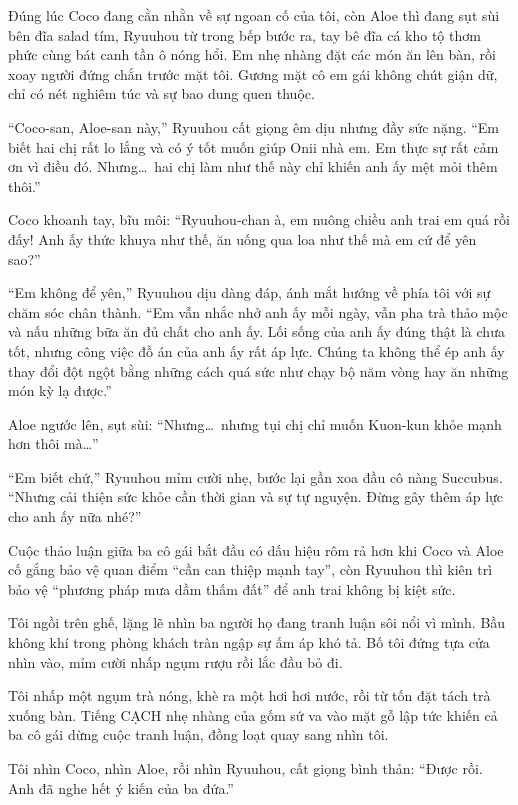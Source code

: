 \documentclass[../main.tex]{subfiles}
\begin{document}
\ct

Đúng lúc Coco đang cằn nhằn về sự ngoan cố của tôi, còn Aloe thì đang sụt sùi bên đĩa salad tím, Ryuuhou từ trong bếp bước ra, tay bê đĩa cá kho tộ thơm phức cùng bát canh tần ô nóng hổi. Em nhẹ nhàng đặt các món ăn lên bàn, rồi xoay người đứng chắn trước mặt tôi. Gương mặt cô em gái không chút giận dữ, chỉ có nét nghiêm túc và sự bao dung quen thuộc.

``Coco-san, Aloe-san này,'' Ryuuhou cất giọng êm dịu nhưng đầy sức nặng. ``Em biết hai chị rất lo lắng và có ý tốt muốn giúp Onii nhà em. Em thực sự rất cảm ơn vì điều đó. Nhưng\dots\ hai chị làm như thế này chỉ khiến anh ấy mệt mỏi thêm thôi.''

Coco khoanh tay, bĩu môi: ``Ryuuhou-chan à, em nuông chiều anh trai em quá rồi đấy! Anh ấy thức khuya như thế, ăn uống qua loa như thế mà em cứ để yên sao?''

``Em không để yên,'' Ryuuhou dịu dàng đáp, ánh mắt hướng về phía tôi với sự chăm sóc chân thành. ``Em vẫn nhắc nhở anh ấy mỗi ngày, vẫn pha trà thảo mộc và nấu những bữa ăn đủ chất cho anh ấy. Lối sống của anh ấy đúng thật là chưa tốt, nhưng công việc đồ án của anh ấy rất áp lực. Chúng ta không thể ép anh ấy thay đổi đột ngột bằng những cách quá sức như chạy bộ năm vòng hay ăn những món kỳ lạ được.''

Aloe ngước lên, sụt sùi: ``Nhưng\dots\ nhưng tụi chị chỉ muốn Kuon-kun khỏe mạnh hơn thôi mà\dots''

``Em biết chứ,'' Ryuuhou mỉm cười nhẹ, bước lại gần xoa đầu cô nàng Succubus. ``Nhưng cải thiện sức khỏe cần thời gian và sự tự nguyện. Đừng gây thêm áp lực cho anh ấy nữa nhé?''

Cuộc thảo luận giữa ba cô gái bắt đầu có dấu hiệu rôm rả hơn khi Coco và Aloe cố gắng bảo vệ quan điểm ``cần can thiệp mạnh tay'', còn Ryuuhou thì kiên trì bảo vệ ``phương pháp mưa dầm thấm đất'' để anh trai không bị kiệt sức.

Tôi ngồi trên ghế, lặng lẽ nhìn ba người họ đang tranh luận sôi nổi vì mình. Bầu không khí trong phòng khách tràn ngập sự ấm áp khó tả. Bố tôi đứng tựa cửa nhìn vào, mỉm cười nhấp ngụm rượu rồi lắc đầu bỏ đi.

Tôi nhấp một ngụm trà nóng, khè ra một hơi hơi nước, rồi từ tốn đặt tách trà xuống bàn. Tiếng CẠCH nhẹ nhàng của gốm sứ va vào mặt gỗ lập tức khiến cả ba cô gái dừng cuộc tranh luận, đồng loạt quay sang nhìn tôi.

Tôi nhìn Coco, nhìn Aloe, rồi nhìn Ryuuhou, cất giọng bình thản: ``Được rồi. Anh đã nghe hết ý kiến của ba đứa.''
\end{document}
